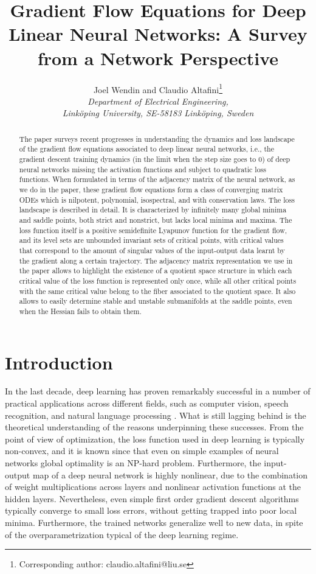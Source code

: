 \documentclass{article}
\title{Gradient Flow Equations for Deep Linear Neural Networks: A Survey from a Network Perspective}
\author{Joel Wendin and Claudio Altafini\footnote{Corresponding author: claudio.altafini@liu.se} \\ {\itshape\small Department of Electrical Engineering,}\\ {\itshape\small Link{\"o}ping University, SE-58183 Link{\"o}ping, Sweden}}
\newcommand{\1}{\mathds{1}}
\begin{document}
	\maketitle

	\begin{abstract}
The paper surveys recent progresses in understanding the dynamics and loss landscape of the gradient flow equations associated to deep linear neural networks, i.e., the gradient descent training dynamics (in the limit when the step size goes to 0) of deep neural networks missing the activation functions and subject to quadratic loss functions. 
When formulated in terms of the adjacency matrix of the neural network, as we do in the paper, these gradient flow  equations form a class of converging matrix ODEs which is nilpotent, polynomial, isospectral, and with conservation laws. 
The loss landscape is described in detail. It is characterized by infinitely many global minima and saddle points, both strict and nonstrict, but lacks local minima and maxima.
The loss function itself is a positive semidefinite Lyapunov function for the gradient flow, and its level sets are unbounded invariant sets of critical points,  with critical values that correspond to the amount of singular values of the input-output data learnt by the gradient along a certain trajectory. 
The adjacency matrix representation we use in the paper allows to highlight the existence of a quotient space structure in which each critical value of the loss function is represented only once, while all other critical points with the same critical value belong to the fiber associated to the quotient space. It also allows to easily determine stable and unstable submanifolds at the saddle points, even when the Hessian fails to obtain them.


	\end{abstract}
	
\section{Introduction}



In the last decade, deep learning has proven remarkably successful in a number of practical applications across different fields, such as computer vision, speech recognition, and natural language processing \cite{lecun2015deep}. 
What is still lagging behind is the theoretical understanding of the reasons underpinning these successes.
From the point of view of optimization, the loss function used in deep learning is typically non-convex, and it is known since \cite{blum1988training} that even on simple examples of neural networks global optimality is an NP-hard problem. 
Furthermore, the input-output map of a deep neural network is highly nonlinear, due to the combination of weight multiplications across layers and nonlinear activation functions at the hidden layers.
Nevertheless, even simple first order gradient descent algorithms typically converge to small loss errors, without getting trapped into poor local minima. 
Furthermore, the trained networks generalize well to new data, in spite of the overparametrization typical of the deep learning regime. 
\end{document}
